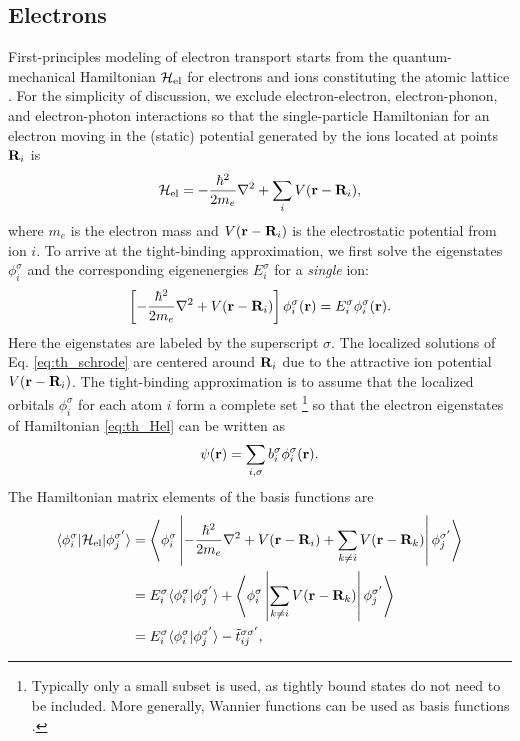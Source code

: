 \subsection{Electrons}
\label{sec:th_eom2_electron}

First-principles modeling of electron transport starts from the quantum-mechanical Hamiltonian $\mathcal{H}_{\textrm{el}}$ for electrons and ions constituting the atomic lattice \cite{ashcroftmermin}. For the simplicity of discussion, we exclude electron-electron, electron-phonon, and electron-photon interactions so that the single-particle Hamiltonian for an electron moving in the (static) potential generated by the ions located at points $\mathbf{R}_i$ is \cite{ashcroftmermin}
\begin{equation}
 \mathcal{H}_{\textrm{el}} = - \frac{\hbar^2}{2m_e} \nabla^2  + \sum_i V(\mathbf{r}-\mathbf{R}_i), \label{eq:th_Hel}
\end{equation}
where $m_e$ is the electron mass and $V(\mathbf{r}-\mathbf{R}_i)$ is the electrostatic potential from ion $i$. To arrive at the tight-binding approximation, we first solve the eigenstates $\phi_i^{\sigma}$ and the corresponding eigenenergies $E_i^{\sigma}$ for a \textit{single} ion:
\begin{equation}
 \left[ - \frac{\hbar^2}{2m_e} \nabla^2  +  V(\mathbf{r}-\mathbf{R}_i) \right] \phi_i^{\sigma} (\mathbf{r}) = E_i^{\sigma} \phi_i^{\sigma}(\mathbf{r}). \label{eq:th_schrode}
\end{equation}
Here the eigenstates are labeled by the superscript $\sigma$. The localized solutions of Eq. \eqref{eq:th_schrode} are centered around $\mathbf{R}_i$ due to the attractive ion potential $V(\mathbf{r}-\mathbf{R}_i)$. The tight-binding approximation is to assume that the localized orbitals $\phi_i^{\sigma}$ for each atom $i$ form a complete set \footnote{Typically only a small subset is used, as tightly bound states do not need to be included. More generally, Wannier functions can be used as basis functions \cite{ashcroftmermin}.} so that the electron eigenstates of Hamiltonian \eqref{eq:th_Hel} can be written as
\begin{equation}
 \psi(\mathbf{r}) = \sum_{i,\sigma} b_i^{\sigma} \phi_{i}^{\sigma}(\mathbf{r}).
\end{equation}
The Hamiltonian matrix elements of the basis functions are
\begin{alignat}{2}
 \langle \phi_i^{\sigma} | \mathcal{H}_{\textrm{el}} | \phi_j^{\sigma'} \rangle &= \left\langle \phi_i^{\sigma} \left| - \frac{\hbar^2}{2m_e} \nabla^2  +V(\mathbf{r}-\mathbf{R}_i)+ \sum_{k\neq i} V(\mathbf{r}-\mathbf{R}_k) \right |\phi_j^{\sigma'} \right\rangle \\
 &= E_i^{\sigma} \langle \phi_i^{\sigma}|\phi_j^{\sigma'} \rangle + \left\langle \phi_i^{\sigma} \left| \sum_{k\neq i} V(\mathbf{r}-\mathbf{R}_k) \right| \phi_j^{\sigma'} \right\rangle \label{eq:th_Helements1} \\
  & = E_i^{\sigma} \langle \phi_i^{\sigma}|\phi_j^{\sigma'} \rangle  - \tilde t_{ij}^{\sigma\sigma'}, \label{eq:th_Helements}
\end{alignat}
